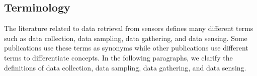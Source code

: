 
\subsection{Terminology}


The literature related to data retrieval from sensors defines many different
terms such as data collection, data sampling, data gathering, and data sensing.
Some publications use these terms as synonyms while other publications use
different terms to differentiate concepts. In the following paragraphs, we
clarify the definitions of data collection, data sampling, data gathering, and
data sensing.



